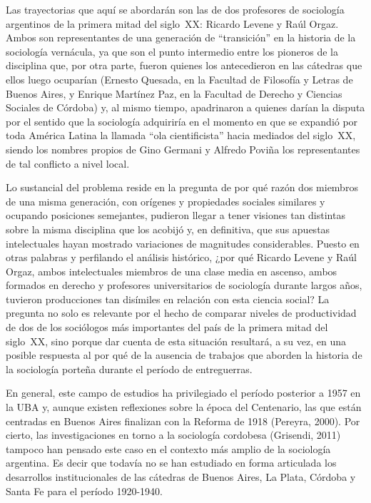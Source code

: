 Las trayectorias que aquí se abordarán son las de dos profesores de sociología argentinos de la primera mitad del siglo~XX: Ricardo Levene y Raúl Orgaz. Ambos son representantes de una generación de \enquote{transición} en la historia de la sociología vernácula, ya que son el punto intermedio entre los pioneros de la disciplina que, por otra parte, fueron quienes los antecedieron en las cátedras que ellos luego ocuparían (Ernesto Quesada, en la Facultad de Filosofía y Letras de Buenos Aires, y Enrique Martínez Paz, en la Facultad de Derecho y Ciencias Sociales de Córdoba) y, al mismo tiempo, apadrinaron a quienes darían la disputa por el sentido que la sociología adquiriría en el momento en que se expandió por toda América Latina la llamada \enquote{ola cientificista} hacia mediados del siglo~XX, siendo los nombres propios de Gino Germani y Alfredo Poviña los representantes de tal conflicto a nivel local.

Lo sustancial del problema reside en la pregunta de por qué razón dos miembros de una misma generación, con orígenes y propiedades sociales similares y ocupando posiciones semejantes, pudieron llegar a tener visiones tan distintas sobre la misma disciplina que los acobijó y, en definitiva, que sus apuestas intelectuales hayan mostrado variaciones de magnitudes considerables. Puesto en otras palabras y perfilando el análisis histórico, ¿por qué Ricardo Levene y Raúl Orgaz, ambos intelectuales miembros de una clase media en ascenso, ambos formados en derecho y profesores universitarios de sociología durante largos años, tuvieron producciones tan disímiles en relación con esta ciencia social? La pregunta no solo es relevante por el hecho de comparar niveles de productividad de dos de los sociólogos más importantes del país de la primera mitad del siglo~XX, sino porque dar cuenta de esta situación resultará, a su vez, en una posible respuesta al por qué de la ausencia de trabajos que aborden la historia de la sociología porteña durante el período de entreguerras.

En general, este campo de estudios ha privilegiado el período posterior a 1957 en la UBA \parencite[por ejemplo][entre otros]{1450-VERON1974,1508-SIDICARO1993,1550-BLOIS2018} y, aunque existen reflexiones sobre la época del Centenario, las que están centradas en Buenos Aires finalizan con la Reforma de 1918 (Pereyra, 2000). Por cierto, las investigaciones en torno a la sociología cordobesa \parencite[por ejemplo][]{1447-CARACCIOLO2010,1528-REQUENA2010}(Grisendi, 2011) tampoco han pensado este caso en el contexto más amplio de la sociología argentina. Es decir que todavía no se han estudiado en forma articulada los desarrollos institucionales de las cátedras de Buenos Aires, La Plata, Córdoba y Santa Fe para el período 1920-1940.

